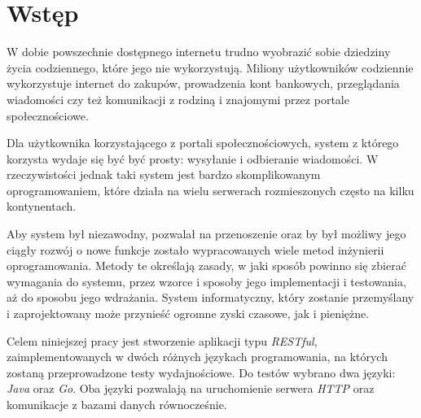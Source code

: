 \chapter{Wstęp}

W dobie powszechnie dostępnego internetu trudno wyobrazić sobie dziedziny życia codziennego, które jego nie wykorzystują. Miliony użytkowników codziennie wykorzystuje internet do zakupów, prowadzenia kont bankowych, przeglądania wiadomości czy też komunikacji z rodziną i znajomymi przez portale społecznościowe. 

Dla użytkownika korzystającego z portali społecznościowych, system z którego korzysta wydaje się być być prosty: wysyłanie i odbieranie wiadomości. W rzeczywistości jednak taki system jest bardzo skomplikowanym oprogramowaniem, które działa na wielu serwerach rozmieszonych często na kilku kontynentach. 

Aby system był niezawodny, pozwalał na przenoszenie oraz by był możliwy jego ciągły rozwój o nowe funkcje zostało wypracowanych wiele metod inżynierii oprogramowania. Metody te określają zasady, w jaki sposób powinno się zbierać wymagania do systemu, przez wzorce i sposoby jego implementacji i testowania, aż do sposobu jego wdrażania. System informatyczny, który zostanie przemyślany i zaprojektowany może przynieść ogromne zyski czasowe, jak i pieniężne. 

Celem niniejszej pracy jest stworzenie aplikacji typu \textsl{RESTful}, zaimplementowanych  w dwóch różnych językach programowania, na których zostaną przeprowadzone testy wydajnościowe. Do testów wybrano dwa języki: \textsl{Java} oraz \textsl{Go}. Oba języki pozwalają na uruchomienie serwera \textsl{HTTP} oraz komunikacje z bazami danych równocześnie. 